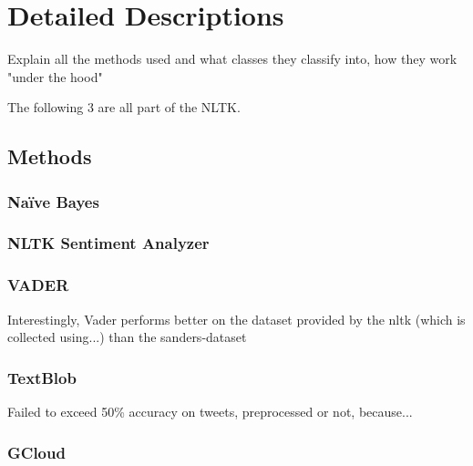 \chapter{Detailed Descriptions}
\label{chapter:DetailedDescriptions}\label{sentimentanalysis}


Explain all the methods used and what classes they classify into, how they work "under the hood"

The following 3 are all part of the NLTK.
\section{Methods}
\label{sec:methods}

\subsection{Na\"{i}ve Bayes}
\label{subsec:naivebayes}

\subsection{NLTK Sentiment Analyzer}
\label{subsec:nltksentimentanalyzer}

\subsection{VADER}
\label{subsec:vader}

Interestingly, Vader performs better on the dataset provided by the nltk (which is collected using...) than the sanders-dataset

\subsection{TextBlob}
\label{subsec:textblob}

Failed to exceed 50\% accuracy on tweets, preprocessed or not, because...

\subsection{GCloud}
\label{subsec:gcloud}

